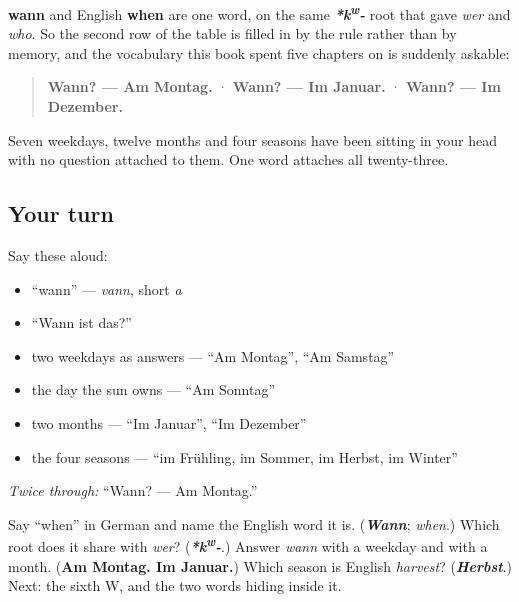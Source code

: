 \begin{cousinweb}
\textbf{wann} and English \textbf{when} are one word, on the same \emph{\textbf{*k\textsuperscript{w}-}} root that gave \emph{wer} and \emph{who}. So the second row of the table is filled in by the rule rather than by memory, and the vocabulary this book spent five chapters on is suddenly askable:

\begin{quote}
\textbf{Wann? — Am Montag.} · \textbf{Wann? — Im Januar.} · \textbf{Wann? — Im Dezember.}
\end{quote}

Seven weekdays, twelve months and four seasons have been sitting in your head with no question attached to them. One word attaches all twenty-three.
\end{cousinweb}

\subsection*{Your turn}
Say these aloud:

\begin{itemize}
\raggedright
  \item \textquotedblleft{}wann\textquotedblright{} — \emph{vann}, short \emph{a}
  \item \textquotedblleft{}Wann ist das?\textquotedblright{}
  \item two weekdays as answers — \textquotedblleft{}Am Montag\textquotedblright{}, \textquotedblleft{}Am Samstag\textquotedblright{}
  \item the day the sun owns — \textquotedblleft{}Am Sonntag\textquotedblright{}
  \item two months — \textquotedblleft{}Im Januar\textquotedblright{}, \textquotedblleft{}Im Dezember\textquotedblright{}
  \item the four seasons — \textquotedblleft{}im Frühling, im Sommer, im Herbst, im Winter\textquotedblright{}
\end{itemize}

\emph{Twice through:} \textquotedblleft{}Wann? — Am Montag.\textquotedblright{}

\begin{tcolorbox}[breakable,colback=teal!4,colframe=teal!35!black,title={Before you move on}]
Say \textquotedblleft{}when\textquotedblright{} in German and name the English word it is. (\emph{\textbf{Wann}}; \emph{when}.) Which root does it share with \emph{wer}? (\emph{\textbf{*k\textsuperscript{w}-}}.) Answer \emph{wann} with a weekday and with a month. (\textbf{Am Montag. Im Januar.}) Which season is English \emph{harvest}? (\emph{\textbf{Herbst}}.) Next: the sixth W, and the two words hiding inside it.
\end{tcolorbox}
